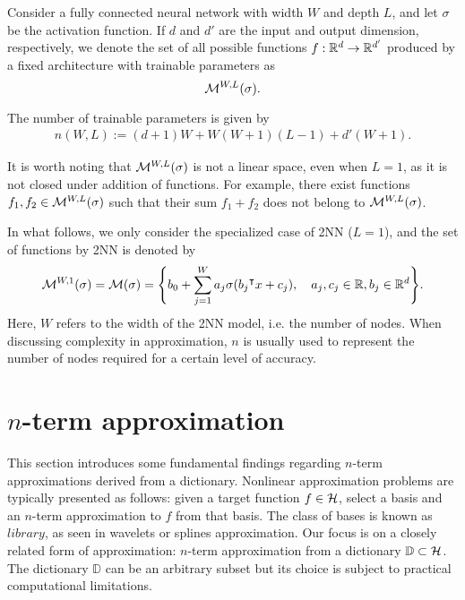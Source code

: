 Consider a fully connected neural network with width $W$ and depth $L$, and let
$\sigma$ be the activation function. If $d$ and $d'$ are the input and output
dimension, respectively, we denote the set of all possible functions $f: \mathbb{R}^d
\to \mathbb{R}^{d'}$ produced by a fixed architecture with trainable parameters as
\begin{equation}
    \mathcal{M}^{ {W}, {L} }( {\sigma} ).
\end{equation}

The number of trainable parameters is given by 
\begin{align}
    n(W, L) := (d + 1)W + W(W + 1)(L - 1) + d'(W + 1).
\end{align}

\begin{remark}
    It is worth noting that $\mathcal{M}^{ {W}, {L} }( {\sigma} )$ is not a linear space, even
    when $L = 1$, as it is not closed under addition of functions. For example,
    there exist functions $f_1, f_2 \in \mathcal{M}^{ {W}, {L} }( {\sigma} )$ such that their
    sum $f_1 + f_2$ does not belong to $\mathcal{M}^{ {W}, {L} }( {\sigma} )$.
\end{remark}

In what follows, we only consider the specialized case of 2NN ($L=1$), and the
set of functions by 2NN is denoted by
\begin{equation}
    \label{eq:set_of_all_functions_2nn}
    \mathcal{M}^{ {W}, {1} }( {\sigma} ) = \mathcal{M}(\sigma) =  \Bigg\{
        b_0 + \sum_{j=1}^W a_j \sigma(b_j{}^{\intercal} x + c_j), \quad
        a_j, c_j \in \mathbb{R},  b_j \in \mathbb{R}^d
    \Bigg\}.
\end{equation}
Here, $W$ refers to the width of the 2NN model, i.e. the number of nodes. When
discussing complexity in approximation, $n$ is usually used to represent the
number of nodes required for a certain level of accuracy.

\section{$n$-term approximation}
\label{sec:preliminary}




This section introduces some fundamental findings regarding $n$-term
approximations derived from a dictionary. Nonlinear approximation problems are
typically presented as follows: given a target function $f\in\mathcal{H}$, select a
basis and an $n$-term approximation to $f$ from that basis. The class of bases
is known as $library$, as seen in wavelets or splines approximation. Our focus
is on a closely related form of approximation: $n$-term approximation from a
dictionary $\mathbb{D} \subset \mathcal{H}$. The dictionary $\mathbb{D}$ can be an
arbitrary subset but its choice is subject to practical computational
limitations. 

